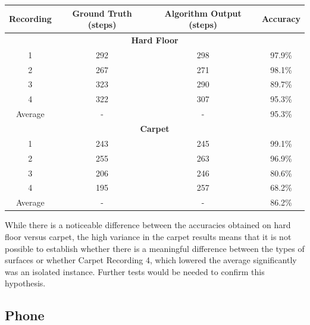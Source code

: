                 \begin{center}
                    \label{tbl_surface_results}
                    \begin{tabular}{|c|c|c|c|}
                        \hline
                        Recording & Ground Truth (steps) & Algorithm Output (steps) & Accuracy \\
                        \hline
                        \multicolumn{4}{|c|}{\textbf{Hard Floor}} \\
                        \hline
                        1 & 292 & 298 & 97.9\% \\
                        2 & 267 & 271 & 98.1\% \\
                        3 & 323 & 290 & 89.7\% \\
                        4 & 322 & 307 & 95.3\% \\
                        \hline
                        Average & - & - & 95.3\% \\
                        \hline
                        \multicolumn{4}{|c|}{\textbf{Carpet}} \\                        
                        \hline
                        1 & 243 & 245 & 99.1\% \\
                        2 & 255 & 263 & 96.9\% \\
                        3 & 206 & 246 & 80.6\% \\
                        4 & 195 & 257 & 68.2\% \\
                        \hline
                        Average & - & - & 86.2\% \\
                        \hline
                    \end{tabular}
                \end{center}

                While there is a noticeable difference between the accuracies obtained on hard floor versus carpet, the high variance in the carpet results means that it is not possible to establish whether there is a meaningful difference between the types of surfaces or whether Carpet Recording 4, which lowered the average significantly was an isolated instance. Further tests would be needed to confirm this hypothesis.

            \subsection{Phone}

